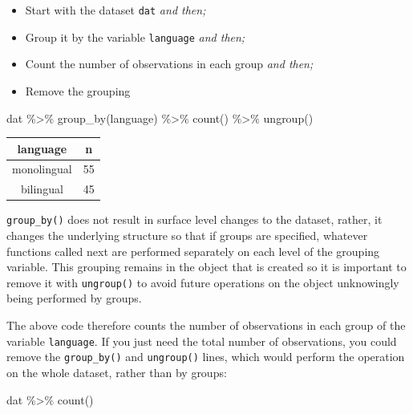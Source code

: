 \documentclass[
  english,
  doc,floatsintext]{apa6}
\newenvironment{Shaded}{\begin{snugshade}}{\end{snugshade}}
\newcommand{\FunctionTok}[1]{\textcolor[rgb]{0.00,0.00,0.00}{#1}}
\newcommand{\NormalTok}[1]{#1}
\newcommand{\SpecialCharTok}[1]{\textcolor[rgb]{0.00,0.00,0.00}{#1}}
\begin{document}
\begin{itemize}
\item
  Start with the dataset \texttt{dat} \emph{and then;}
\item
  Group it by the variable \texttt{language} \emph{and then;}
\item
  Count the number of observations in each group \emph{and then;}
\item
  Remove the grouping
\end{itemize}

\begin{Shaded}
\begin{Highlighting}[]
\NormalTok{dat }\SpecialCharTok{\%\textgreater{}\%}
  \FunctionTok{group\_by}\NormalTok{(language) }\SpecialCharTok{\%\textgreater{}\%}
  \FunctionTok{count}\NormalTok{() }\SpecialCharTok{\%\textgreater{}\%}
  \FunctionTok{ungroup}\NormalTok{()}
\end{Highlighting}
\end{Shaded}

\begin{tabular}{c|c}
\hline
language & n\\
\hline
monolingual & 55\\
\hline
bilingual & 45\\
\hline
\end{tabular}

\texttt{group\_by()} does not result in surface level changes to the dataset, rather, it changes the underlying structure so that if groups are specified, whatever functions called next are performed separately on each level of the grouping variable. This grouping remains in the object that is created so it is important to remove it with \texttt{ungroup()} to avoid future operations on the object unknowingly being performed by groups.

The above code therefore counts the number of observations in each group of the variable \texttt{language}. If you just need the total number of observations, you could remove the \texttt{group\_by()} and \texttt{ungroup()} lines, which would perform the operation on the whole dataset, rather than by groups:

\begin{Shaded}
\begin{Highlighting}[]
\NormalTok{dat }\SpecialCharTok{\%\textgreater{}\%}
  \FunctionTok{count}\NormalTok{()}
\end{Highlighting}
\end{Shaded}
\end{document}
